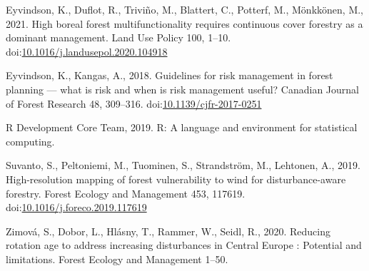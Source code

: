 \documentclass[]{elsarticle} %
\begin{document}
\leavevmode\hypertarget{ref-Eyvindson2020}{}%
Eyvindson, K., Duflot, R., Triviño, M., Blattert, C., Potterf, M., Mönkkönen, M., 2021. High boreal forest multifunctionality requires continuous cover forestry as a dominant management. Land Use Policy 100, 1--10. doi:\href{https://doi.org/10.1016/j.landusepol.2020.104918}{10.1016/j.landusepol.2020.104918}

\leavevmode\hypertarget{ref-Eyvindson2018}{}%
Eyvindson, K., Kangas, A., 2018. Guidelines for risk management in forest planning --- what is risk and when is risk management useful? Canadian Journal of Forest Research 48, 309--316. doi:\href{https://doi.org/10.1139/cjfr-2017-0251}{10.1139/cjfr-2017-0251}

\leavevmode\hypertarget{ref-RDevelopmentCoreTeam2019}{}%
R Development Core Team, 2019. R: A language and environment for statistical computing.

\leavevmode\hypertarget{ref-Suvanto2019}{}%
Suvanto, S., Peltoniemi, M., Tuominen, S., Strandström, M., Lehtonen, A., 2019. High-resolution mapping of forest vulnerability to wind for disturbance-aware forestry. Forest Ecology and Management 453, 117619. doi:\href{https://doi.org/10.1016/j.foreco.2019.117619}{10.1016/j.foreco.2019.117619}

\leavevmode\hypertarget{ref-Zimova2020}{}%
Zimová, S., Dobor, L., Hlásny, T., Rammer, W., Seidl, R., 2020. Reducing rotation age to address increasing disturbances in Central Europe : Potential and limitations. Forest Ecology and Management 1--50.
\end{document}
